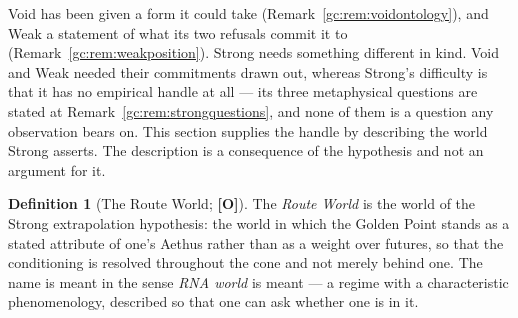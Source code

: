 \documentclass[11pt]{article}
\numberwithin{equation}{section}
\theoremstyle{plain}
\theoremstyle{definition}
\newtheorem{definition}[theorem]{Definition}
\theoremstyle{remark}
\begin{document}
Void has been given a form it could take
(Remark~\ref{gc:rem:voidontology}), and Weak a statement of what its two
refusals commit it to (Remark~\ref{gc:rem:weakposition}). Strong needs
something different in kind. Void and Weak needed their commitments
drawn out, whereas Strong's difficulty is that it has no empirical handle
at all --- its three metaphysical questions are stated at
Remark~\ref{gc:rem:strongquestions}, and none of them is a question any
observation bears on. This section supplies the handle by describing the
world Strong asserts. The description is a consequence of the hypothesis
and not an argument for it.

\begin{definition}[The Route World; \textbf{[O]}]\label{gc:def:routeworld}
The \emph{Route World} is the world of the Strong extrapolation
hypothesis: the world in which the Golden Point stands as a stated
attribute of one's Aethus rather than as a weight over futures, so that
the conditioning is resolved throughout the cone and not merely behind
one. The name is meant in the sense \emph{RNA world} is meant --- a
regime with a characteristic phenomenology, described so that one can
ask whether one is in it.
\end{definition}
\end{document}
